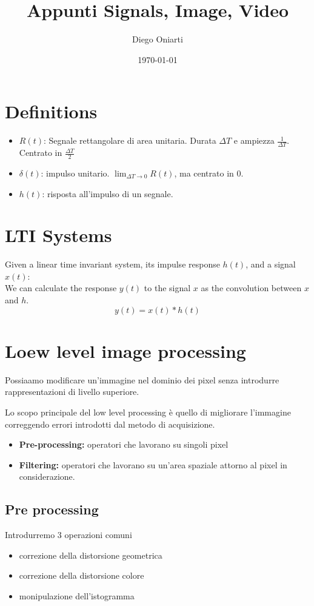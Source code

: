 \documentclass{article}
\title{Appunti Signals, Image, Video}
\author{Diego Oniarti}
\date{\today}
\begin{document}
\maketitle

\section{Definitions}
\begin{itemize}
    \item $R(t)$: Segnale rettangolare di area unitaria. Durata $\Delta T$ e ampiezza $\frac 1 {\Delta T}$. Centrato in $\frac{\Delta T}2$
    \item $\delta(t)$: impulso unitario. $\displaystyle \lim_{\Delta T\to 0}R(t)$, ma centrato in $0$.
    \item $h(t)$: risposta all'impulso di un segnale.
\end{itemize}


\section{LTI Systems}
Given a linear time invariant system, its impulse response $h(t)$, and a signal $x(t)$: \\
We can calculate the response $y(t)$ to the signal $x$ as the convolution between $x$ and $h$.
$$
y(t) = x(t) * h(t)
$$

\section{Loew level image processing}
Possiaamo modificare un'immagine nel dominio dei pixel senza introdurre rappresentazioni di livello superiore.

Lo scopo principale del low level processing è quello di migliorare l'immagine correggendo errori introdotti dal metodo di acquisizione.
\begin{itemize}
    \item \textbf{Pre-processing:} operatori che lavorano su singoli pixel
    \item \textbf{Filtering:} operatori che lavorano su un'area spaziale attorno al pixel in considerazione.
\end{itemize}

\subsection{Pre processing}
Introdurremo 3 operazioni comuni
\begin{itemize}
    \item correzione della distorsione geometrica
    \item correzione della distorsione colore
    \item monipulazione dell'istogramma
\end{itemize}
\end{document}
